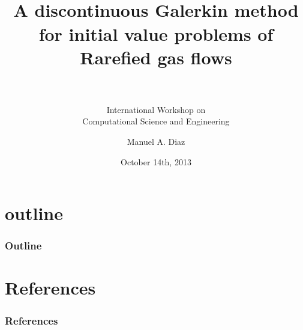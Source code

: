 

\title[IWCSE 2013 \hspace{4em}\insertframenumber/
\inserttotalframenumber]{~ \\ A discontinuous Galerkin method for initial value problems of Rarefied gas flows \\~} %
\subtitle{International Workshop on \\ Computational Science and Engineering}
\author[Aerodynamic Design \& Analysis Lab]{ Manuel A. Diaz} %
\date{October 14th, 2013}



\begin{frame} 
	\maketitle
\end{frame}

\section*{outline} 
\begin{frame}%
	\frametitle{Outline}
	\tableofcontents
\end{frame}







\section{References}
\begin{frame}[allowframebreaks]
	\frametitle{References}
	
	
\end{frame}

